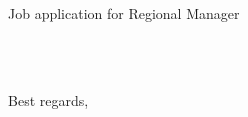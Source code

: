 \documentclass[12pt,a4paper]{resume}
\newcommand{\content}{
}
\begin{document}
\makeheader
\content



\opening{Job application for Regional Manager}

\lipsum[1-1]\\[\baselineskip]
\lipsum[2-2]\\

\closing{Best regards,}

\signature{signature/signature.png}
\end{document}
